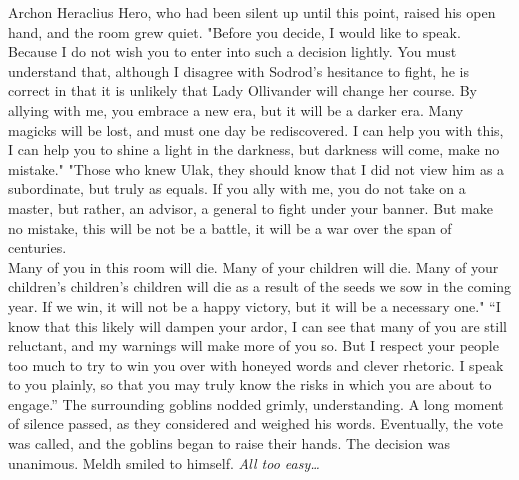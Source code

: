 Archon Heraclius Hero, who had been silent up until this point, raised his open hand, and the room grew quiet. "Before you decide, I would like to speak. Because I do not wish you to enter into such a decision lightly. You must understand that, although I disagree with Sodrod’s hesitance to fight, he is correct in that it is unlikely that Lady Ollivander will change her course. By allying with me, you embrace a new era, but it will be a darker era. Many magicks will be lost, and must one day be rediscovered. I can help you with this, I can help you to shine a light in the darkness, but darkness will come, make no mistake."
\SmallVSpace
"Those who knew Ulak, they should know that I did not view him as a subordinate, but truly as equals. If you ally with me, you do not take on a master, but rather, an advisor, a general to fight under your banner. But make no mistake, this will be not be a battle, it will be a war over the span of centuries.\\Many of you in this room will die. Many of your children will die. Many of your children’s children’s children will die as a result of the seeds we sow in the coming year. If we win, it will not be a happy victory, but it will be a necessary one."
\SmallVSpace
“I know that this likely will dampen your ardor, I can see that many of you are still reluctant, and my warnings will make more of you so. But I respect your people too much to try to win you over with honeyed words and clever rhetoric. I speak to you plainly, so that you may truly know the risks in which you are about to engage.”
\SmallVSpace
The surrounding goblins nodded grimly, understanding. A long moment of silence passed, as they considered and weighed his words. Eventually, the vote was called, and the goblins began to raise their hands. The decision was unanimous.
\SomeVSpace
Meldh smiled to himself.
\SmallVSpace
\emph{All too easy…}